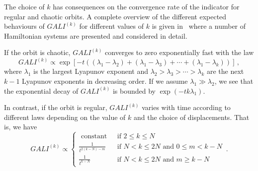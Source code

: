 The choice of $k$ has consequences on the convergence rate of the indicator for regular and chaotic orbits. A complete overview of the different expected behaviours of $GALI^{(k)}$ for different values of $k$ is given in~\cite{SKOKOS200730} where a number of Hamiltonian systems are presented and considered in detail.

If the orbit is chaotic, $GALI^{(k)}$ converges to zero exponentially fast with the law
\begin{equation}
    GALI^{(k)} \propto \exp\left[-t\left((\lambda_1 - \lambda_2)+(\lambda_1 - \lambda_3)+\cdots+(\lambda_1 - \lambda_k)\right)\right] \,,
\end{equation}
where $\lambda_1$ is the largest Lyapunov exponent and $\lambda_2> \lambda_3>\cdots>\lambda_k$ are the next $k-1$ Lyapunov exponents in decreasing order. If we assume $\lambda_1 \gg \lambda_2$, we see that the exponential decay of $GALI^{(k)}$ is bounded by $\exp(-tk\lambda_1)$.

In contrast, if the orbit is regular, $GALI^{(k)}$ varies with time according to different laws depending on the value of $k$ and the choice of displacements. That is, we have
\begin{equation}
    GALI^{(k)} \propto \begin{cases}\text { constant } & \text { if } 2 \leq k \leq N \\ \frac{1}{t^{2(k-N)-m}} & \text { if } N<k \leq 2 N \text { and } 0 \leq m<k-N \\ \frac{1}{t^{k-N}} & \text { if } N<k \leq 2 N \text { and } m \geq k-N\end{cases} \,.
\end{equation}

